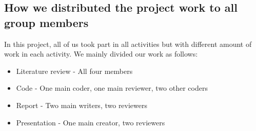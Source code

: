 \documentclass{article}
\begin{document}
\subsection{How we distributed the project work to all group members}
In this project, all of us took part in all activities but with different amount of work in each activity. We mainly divided our work as follows:
\begin{itemize}
  \item Literature review - All four members
  \item Code - One main coder, one main reviewer, two other coders
  \item Report - Two main writers, two reviewers
  \item Presentation - One main creator, two reviewers
\end{itemize}



\medskip


\end{document}
